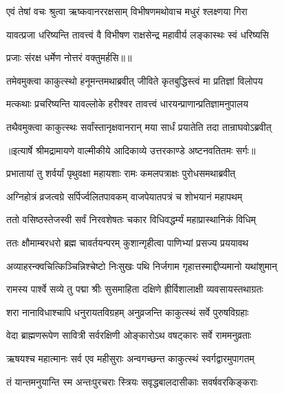 \twolineshloka
{एवं तेषां वचः श्रुत्वा ऋष्कवानररक्षसाम्}
{विभीषणमथोवाच मधुरं श्लक्ष्णया गिरा} %

\twolineshloka
{यावत्प्रजा धरिष्यन्ति तावत्त्वं वै विभीषण}
{राक्षसेन्द्र महावीर्य लङ्कास्थः स्वं धरिष्यसि} %

{प्रजाः संरक्ष धर्मेण नोत्तरं वक्तुमर्हसि॥॥} %

\addtocounter{shlokacount}{1}

\twolineshloka
{तमेवमुक्त्वा काकुत्स्थो हनूमन्तमथाब्रवीत्}
{जीविते कृतबुद्धिस्त्वं मा प्रतिज्ञां विलोपय} %

\twolineshloka
{मत्कथाः प्रचरिष्यन्ति यावल्लोके हरीश्वर}
{तावत्त्वं धारयन्प्राणान्प्रतिज्ञामनुपालय} %

\twolineshloka
{तथैवमुक्त्वा काकुत्स्थः सर्वांस्तानृक्षवानरान्}
{मया सार्धं प्रयातेति तदा तान्राघवोऽब्रवीत्} %


{॥इत्यार्षे श्रीमद्रामायणे वाल्मीकीये आदिकाव्ये उत्तरकाण्डे अष्टनवतितमः सर्गः॥}


\twolineshloka
{प्रभातायां तु शर्वर्यां पृथुवक्षा महायशाः}
{रामः कमलपत्राक्षः पुरोधसमथाब्रवीत्} %

\twolineshloka
{अग्निहोत्रं व्रजत्वग्रे सर्पिर्ज्वलितपावकम्}
{वाजपेयातपत्रं च शोभयानं महापथम्} %

\twolineshloka
{ततो वसिष्ठस्तेजस्वी सर्वं निरवशेषतः}
{चकार विधिवद्धर्म्यं महाप्रास्थानिकं विधिम्} %

\twolineshloka
{ततः क्षौमाम्बरधरो ब्रह्म चावर्तयन्परम्}
{कुशान्गृहीत्वा पाणिभ्यां प्रसज्य प्रययावथ} %

\twolineshloka
{अव्याहरन्क्वचित्किञ्चिन्निश्चेष्टो निःसुखः पथि}
{निर्जगाम गृहात्तस्माद्दीप्यमानो यथांशुमान्} %

\twolineshloka
{रामस्य पार्श्वे सव्ये तु पद्मा श्रीः सुसमाहिता}
{दक्षिणे ह्रीर्विशालाक्षी व्यवसायस्तथाग्रतः} %

\twolineshloka
{शरा नानाविधाश्चापि धनुरायतविग्रहम्}
{अनुव्रजन्ति काकुत्स्थं सर्वे पुरुषविग्रहाः} %

\twolineshloka
{वेदा ब्राह्मणरूपेण सावित्री सर्वरक्षिणी}
{ओङ्कारोऽथ वषट्कारः सर्वे राममनुव्रताः} %

\twolineshloka
{ऋषयश्च महात्मानः सर्व एव महीसुराः}
{अन्वगच्छन्त काकुत्स्थं स्वर्गद्वारमुपागतम्} %

\twolineshloka
{तं यान्तमनुयान्ति स्म अन्तःपुरचराः स्त्रियः}
{सवृद्धबालदासीकाः सवर्षवरकिङ्कराः} %

